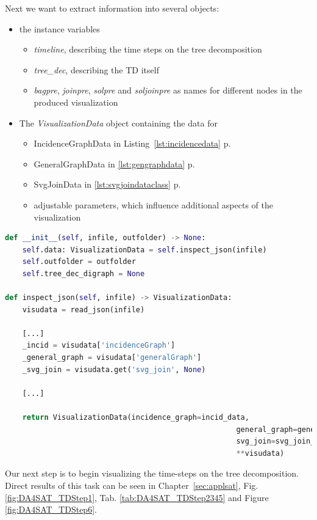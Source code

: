 \documentclass[a4paper, 12pt, bibliography=totoc]{scrartcl}
\begin{document}
Next we want to extract information into several objects: 
\begin{itemize}
	\item the instance variables 
	\begin{itemize}
		\item \textit{timeline}, describing the time steps on the tree decomposition
		\item \textit{tree\_dec}, describing the TD itself
		\item \textit{bagpre}, \textit{joinpre}, \textit{solpre} and \textit{soljoinpre} as names for different nodes in the produced visualization
	\end{itemize}
	\item The \textit{VisualizationData} object containing the data for 
	\begin{itemize}
		\item IncidenceGraphData in Listing~\ref{lst:incidencedata} p. \pageref{lst:incidencedata}
		\item GeneralGraphData in \ref{lst:gengraphdata} p. \pageref{lst:gengraphdata}
		\item SvgJoinData in \ref{lst:svgjoindataclass} p. \pageref{lst:svgjoindataclass}
		\item adjustable parameters, which influence additional aspects of the visualization
	\end{itemize}
\end{itemize}


\begin{lstlisting}[language={Python}, caption={Overview of data initialization}, label={lst:visuinitsmall}]
def __init__(self, infile, outfolder) -> None:
	self.data: VisualizationData = self.inspect_json(infile)
	self.outfolder = outfolder
	self.tree_dec_digraph = None
	
def inspect_json(self, infile) -> VisualizationData:
	visudata = read_json(infile)
	
	[...]
	_incid = visudata['incidenceGraph']
	_general_graph = visudata['generalGraph']
	_svg_join = visudata.get('svg_join', None)
	
	[...]
		
	return VisualizationData(incidence_graph=incid_data,
													 general_graph=general_graph_data,
													 svg_join=svg_join_data,
													 **visudata)
\end{lstlisting}


Our next step is to begin visualizing the time-steps on the tree decomposition. Direct results of this task can be seen in Chapter~\ref{sec:applsat}, Fig. \ref{fig:DA4SAT_TDStep1}, Tab. \ref{tab:DA4SAT_TDStep2345} and Figure \ref{fig:DA4SAT_TDStep6}.\\
\end{document}
